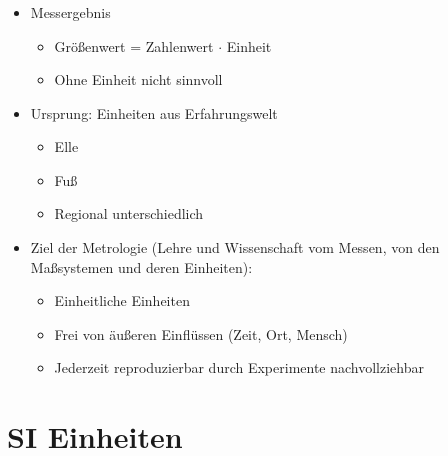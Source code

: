 \begin{frame}
    \frametitle{\insertsection}
    \begin{itemize}
        \item Messergebnis
        \begin{itemize}
            \item Größenwert = Zahlenwert $\cdot$ Einheit
            \item Ohne Einheit nicht sinnvoll
        \end{itemize}
        \item Ursprung: Einheiten aus Erfahrungswelt
        \begin{itemize}
            \item Elle
            \item Fuß
            \item Regional unterschiedlich
        \end{itemize}
        \item Ziel der Metrologie (Lehre und Wissenschaft vom Messen, von den\\ 
              Maßsystemen und deren Einheiten):
              \begin{itemize}
                  \item Einheitliche Einheiten
                  \item Frei von äußeren Einflüssen (Zeit, Ort, Mensch)
                  \item Jederzeit reproduzierbar durch Experimente nachvollziehbar
              \end{itemize}
    \end{itemize}

\end{frame}


\section{SI Einheiten}


